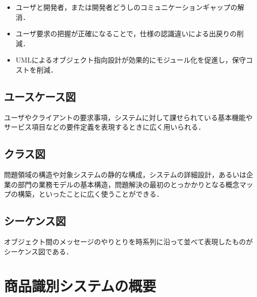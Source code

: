\begin{itemize}
\item ユーザと開発者，または開発者どうしのコミュニケーションギャップの解消．
\item ユーザ要求の把握が正確になることで，仕様の認識違いによる出戻りの削減．
\item UMLによるオブジェクト指向設計が効果的にモジュール化を促進し，保守コストを削減．
\end{itemize}

\subsection*{ユースケース図}

ユーザやクライアントの要求事項，システムに対して課せられている基本機能やサービス項目などの要件定義を表現するときに広く用いられる\cite{uml}．

\subsection*{クラス図}

問題領域の構造や対象システムの静的な構成，システムの詳細設計，あるいは企業の部門の業務モデルの基本構造，問題解決の最初のとっかかりとなる概念マップの構築，といったことに広く使\cite{uml}うことができる．

\subsection*{シーケンス図}

オブジェクト間のメッセージのやりとりを時系列に沿って並べて表現したもの\cite{uml}がシーケンス図である．


\section{商品識別システムの概要}